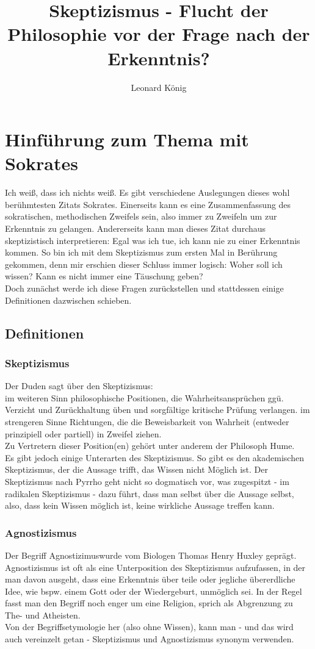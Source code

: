 \documentclass[12pt,a4paper]{article}
\author{Leonard König}
\title{Skeptizismus - Flucht der Philosophie vor der Frage nach der Erkenntnis?}
\begin{document}
\maketitle
\tableofcontents
\newpage
\section{Hinführung zum Thema mit Sokrates}
\glqq Ich weiß, dass ich nichts weiß\grqq. Es gibt verschiedene Auslegungen dieses wohl berühmtesten Zitats Sokrates.%
 Einerseits kann es eine Zusammenfassung des sokratischen, methodischen Zweifels sein, also immer zu Zweifeln um zur Erkenntnis zu gelangen. Andererseits kann man dieses Zitat durchaus skeptizistisch interpretieren: Egal was ich tue, ich kann nie zu einer Erkenntnis kommen. So bin ich mit dem Skeptizismus zum ersten Mal in Berührung gekommen, denn mir erschien dieser Schluss immer logisch: Woher soll ich wissen? Kann es nicht immer eine Täuschung geben?\\
Doch zunächst werde ich diese Fragen zurückstellen und stattdessen einige Definitionen dazwischen schieben.
	\subsection{Definitionen}
		\subsubsection{Skeptizismus}
Der Duden sagt über den Skeptizismus:\\
\glqq im weiteren Sinn philosophische Positionen, die Wahrheitsansprüchen ggü. Verzicht und Zurückhaltung üben und sorgfältige kritische Prüfung verlangen.
im strengeren Sinne Richtungen, die die Beweisbarkeit von Wahrheit (entweder prinzipiell oder partiell) in Zweifel ziehen.\grqq%
\\Zu Vertretern dieser Position(en) gehört unter anderem 
der Philosoph Hume.\\%
Es gibt jedoch einige Unterarten des Skeptizismus. So gibt es den akademischen Skeptizismus, der die Aussage trifft, das Wissen nicht Möglich ist. Der Skeptizismus nach Pyrrho geht nicht so dogmatisch vor, was zugespitzt - im radikalen Skeptizismus - dazu führt, dass man selbst über die Aussage selbst, also, dass kein Wissen möglich ist, keine wirkliche Aussage treffen kann.%
		\subsubsection{Agnostizismus}
Der Begriff \glqq Agnostizimus\grqq wurde vom Biologen Thomas Henry Huxley geprägt. Agnostizismus ist oft als eine Unterposition des Skeptizismus aufzufassen, in der man davon ausgeht, dass eine Erkenntnis über teile oder jegliche übererdliche%
 Idee, wie bspw. einem Gott oder der Wiedergeburt, unmöglich sei. In der Regel fasst man den Begriff noch enger um eine Religion, sprich als Abgrenzung zu The- und Atheisten.\\ 
Von der Begriffsetymologie her (also \glqq ohne Wissen\grqq), kann man - und das wird auch vereinzelt getan - Skeptizismus und Agnostizismus synonym verwenden.
\end{document}
